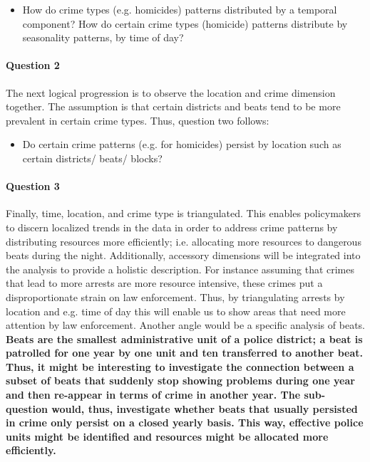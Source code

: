 \documentclass[a4paper]{article}
\begin{document}
\begin{itemize}
  \item How do crime types (e.g. homicides) patterns distributed by a temporal component? How do certain crime types (homicide) patterns distribute by seasonality patterns, by time of day?
\end{itemize}

\paragraph{Question 2} The next logical progression is to observe the location and crime dimension together. The assumption is that certain districts and beats tend to be more prevalent in certain crime types. Thus, question two follows:

\begin{itemize}
  \item Do certain crime patterns (e.g. for homicides) persist by location such as certain districts/ beats/ blocks?
\end{itemize}

\paragraph{Question 3}Finally, time, location, and crime type is triangulated. This enables policymakers to discern localized trends in the data in order to address crime patterns by distributing resources more efficiently; i.e. allocating more resources to dangerous beats during the night. Additionally, accessory dimensions will be integrated into the analysis to provide a holistic description. For instance assuming that crimes that lead to more arrests are more resource intensive, these crimes put a disproportionate strain on law enforcement. Thus, by triangulating arrests by location and e.g. time of day this will enable us to show areas that need more attention by law enforcement. Another angle would be a specific analysis of beats. \textbf{Beats are the smallest administrative unit of a police district; a beat is patrolled for one year by one unit and ten transferred to another beat. Thus, it might be interesting to investigate the connection between a subset of beats that suddenly stop showing problems during one year and then re-appear in terms of crime in another year. The sub-question would, thus, investigate whether beats that usually persisted in crime only persist on a closed yearly basis. This way, effective police units might be identified and resources might be allocated more efficiently.}
 
\end{document}
